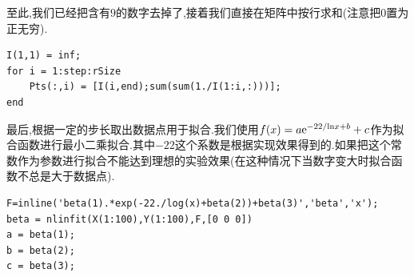 \documentclass[a4paper,12pt]{article}
\begin{document}
\begin{CJK*}{UTF8}{gbsn}
至此,我们已经把含有$9$的数字去掉了,接着我们直接在矩阵中按行求和(注意把$0$置为正无穷).
\vspace{-17pt}
\begin{lstlisting}
I(1,1) = inf;
for i = 1:step:rSize
    Pts(:,i) = [I(i,end);sum(sum(1./I(1:i,:)))];
end
\end{lstlisting}
\vspace{9pt}

最后,根据一定的步长取出数据点用于拟合.我们使用$f(x) = a {\rm e}^{{-22/{\rm ln}x+b}}+c$作为拟合函数进行最小二乘拟合.其中$-22$这个系数是根据实现效果得到的.如果把这个常数作为参数进行拟合不能达到理想的实验效果(在这种情况下当数字变大时拟合函数不总是大于数据点).
\vspace{-17pt}
\begin{lstlisting}
F=inline('beta(1).*exp(-22./log(x)+beta(2))+beta(3)','beta','x');
beta = nlinfit(X(1:100),Y(1:100),F,[0 0 0])
a = beta(1);
b = beta(2);
c = beta(3);
\end{lstlisting}
\vspace{9pt}



\end{CJK*}
\end{document}
